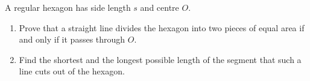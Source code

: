 A regular hexagon has side length $s$ and centre $O$.
\begin{enumerate}
\item[(a)] Prove that a straight line divides the hexagon into two pieces of equal area if and only if it passes through $O$.
\item[(b)] Find the shortest and the longest possible length of the segment that such a line cuts out of the hexagon.
\end{enumerate}
